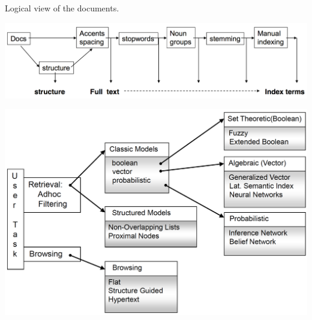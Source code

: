 \begin{breakbox}
\newline Logical view of the documents.
\begin{center}
\includegraphics[width=.15\textwidth]{slides_images/full_to_index}
\end{center}
\end{breakbox}

\begin{breakbox}
\begin{center}
\includegraphics[width=.15\textwidth]{slides_images/ir_models}
\end{center}
\end{breakbox}
